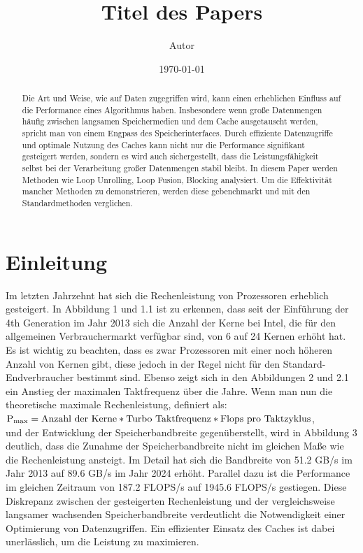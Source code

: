 \documentclass{article}
\title{Titel des Papers}
\author{Autor}
\date{\today}
\begin{document}
\maketitle

\begin{abstract}
    Die Art und Weise, wie auf Daten zugegriffen wird,
    kann einen erheblichen Einfluss auf die Performance eines Algorithmus haben.
    Insbesondere wenn große Datenmengen häufig zwischen langsamen Speichermedien und dem Cache ausgetauscht werden,
    spricht man von einem Engpass des Speicherinterfaces.
    Durch effiziente Datenzugriffe und optimale Nutzung des Caches 
    kann nicht nur die Performance signifikant gesteigert werden, 
    sondern es wird auch sichergestellt, 
    dass die Leistungsfähigkeit selbst bei der Verarbeitung großer Datenmengen stabil bleibt.
    In diesem Paper werden Methoden wie Loop Unrolling, Loop Fusion, Blocking analysiert.
    Um die Effektivität mancher Methoden zu demonstrieren, werden diese gebenchmarkt und mit den Standardmethoden verglichen.
\end{abstract}

\section{Einleitung}
    Im letzten Jahrzehnt hat sich die Rechenleistung von Prozessoren erheblich gesteigert. 
    In Abbildung 1 und 1.1 ist zu erkennen, dass seit der Einführung der 4th Generation im Jahr 2013 sich die Anzahl der Kerne bei Intel, 
    die für den allgemeinen Verbrauchermarkt verfügbar sind, von 6 auf 24 Kernen erhöht hat.
    Es ist wichtig zu beachten, dass es zwar Prozessoren mit einer noch höheren Anzahl von Kernen gibt, 
    diese jedoch in der Regel nicht für den Standard-Endverbraucher bestimmt sind. 
    Ebenso zeigt sich in den Abbildungen 2 und 2.1 ein Anstieg der maximalen Taktfrequenz über die Jahre. 
    Wenn man nun die theoretische maximale Rechenleistung, 
    definiert als:\\ $\textnormal{P}_{\textnormal{max}} = \text{Anzahl der Kerne} * \text{Turbo Taktfrequenz} * \text{Flops pro Taktzyklus}$,\\und
    der Entwicklung der Speicherbandbreite gegenüberstellt, wird in Abbildung 3 deutlich, 
    dass die Zunahme der Speicherbandbreite nicht im gleichen Maße wie die Rechenleistung ansteigt. 
    Im Detail hat sich die Bandbreite von 51.2 GB/s im Jahr 2013 auf 89.6 GB/s im Jahr 2024 erhöht. 
    Parallel dazu ist die Performance im gleichen Zeitraum von 187.2 FLOPS/s auf 1945.6 FLOPS/s gestiegen. 
    Diese Diskrepanz zwischen der gesteigerten Rechenleistung und der vergleichsweise langsamer wachsenden Speicherbandbreite 
    verdeutlicht die Notwendigkeit einer Optimierung von Datenzugriffen. 
    Ein effizienter Einsatz des Caches ist dabei unerlässlich, um die Leistung zu maximieren.
\end{document}
